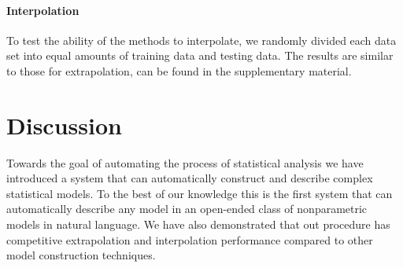 \documentclass[letterpaper]{article}
\begin{document}
\paragraph{Interpolation}
To test the ability of the methods to interpolate, we randomly divided each data set into equal amounts of training data and testing data.
The results are similar to those for extrapolation, can be found in the supplementary material.





\section{Discussion}

Towards the goal of automating the process of statistical analysis we have introduced a system that can automatically construct and describe complex statistical models.
To the best of our knowledge this is the first system that can automatically describe any model in an open-ended class of nonparametric models in natural language.
We have also demonstrated that out procedure has competitive extrapolation and interpolation performance compared to other model construction techniques.



\end{document}
